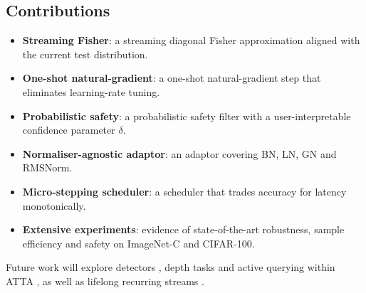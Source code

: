 \documentclass{article} %
\begin{document}
\subsection{Contributions}
\begin{itemize}
  \item \textbf{Streaming Fisher}: a streaming diagonal Fisher approximation aligned with the current test distribution.
  \item \textbf{One-shot natural-gradient}: a one-shot natural-gradient step that eliminates learning-rate tuning.
  \item \textbf{Probabilistic safety}: a probabilistic safety filter with a user-interpretable confidence parameter \(\delta\).
  \item \textbf{Normaliser-agnostic adaptor}: an adaptor covering BN, LN, GN and RMSNorm.
  \item \textbf{Micro-stepping scheduler}: a scheduler that trades accuracy for latency monotonically.
  \item \textbf{Extensive experiments}: evidence of state-of-the-art robustness, sample efficiency and safety on ImageNet-C and CIFAR-100.
\end{itemize}
Future work will explore detectors \cite{yoo-2023-what}, depth tasks \cite{park-2024-test} and active querying within ATTA \cite{gui-2024-active}, as well as lifelong recurring streams \cite{hoang-2023-persistent}.
\end{document}
